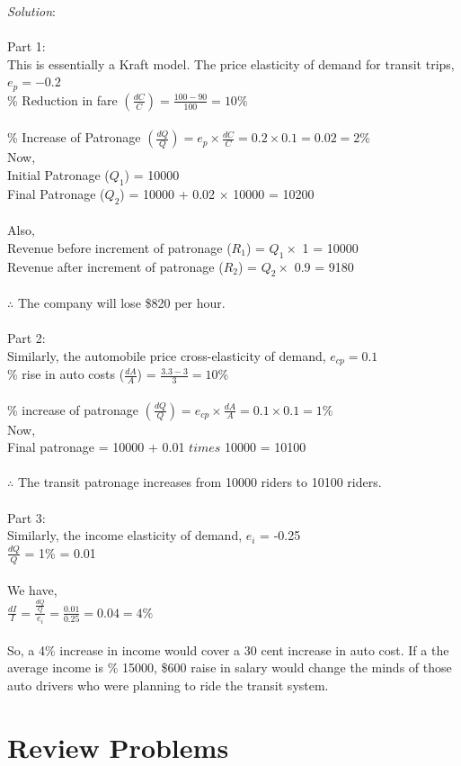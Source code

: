 \textit{Solution}:\\\\
Part 1:\\
This is essentially a Kraft model. The price elasticity of demand for transit trips,\\
$e_p = -0.2$\\
\% Reduction in fare $(\frac{dC}{C}) = \frac{100 - 90}{100} = 10\%$\\\\
\% Increase of Patronage $(\frac{dQ}{Q}) = e_p \times \frac{dC}{C} = 0.2 \times 0.1 = 0.02 = 2\%$\\
Now,\\
Initial Patronage ($Q_1$) = 10000\\
Final Patronage ($ Q_2 $) = 10000 + 0.02 $\times$ 10000 = 10200\\\\
Also,\\
Revenue before increment of patronage ($R_1$) = $Q_1 \times$ 1 = 10000\\
Revenue after increment of patronage ($R_2$) = $Q_2 \times$ 0.9 = 9180\\\\
$\therefore$ The company will lose \$820 per hour.\\\\
Part 2:\\
Similarly, the automobile price cross-elasticity of demand,
$e_{cp} = 0.1$\\
\% rise in auto costs ($\frac{dA}{A}$) = $\frac{3.3 - 3}{3} = 10\%$\\\\
\% increase of patronage $(\frac{dQ}{Q}) = e_{cp} \times \frac{dA}{A} = 0.1 \times 0.1 = 1\% $\\
Now,\\
Final patronage = 10000 + 0.01 $times$ 10000 = 10100\\\\
$\therefore$ The transit patronage increases from 10000 riders to 10100 riders.\\\\
Part 3:\\
Similarly, the income elasticity of demand,
$e_i$ = -0.25\\
$\frac{dQ}{Q}$ = 1\% = 0.01\\\\
We have,\\
$\frac{dI}{I} = \frac{\frac{dQ}{Q}}{e_i} = \frac{0.01}{0.25} = 0.04 = 4\%$\\\\
So, a 4\% increase in income would cover a 30 cent increase in auto cost. If a the average income is \% 15000, \$600 raise in salary would change the minds of those auto drivers who were planning to ride the transit system.
\section{Review Problems}



